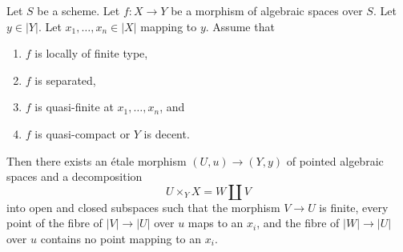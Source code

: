 \begin{lemma}
\label{lemma-etale-splits-off-quasi-finite-part}
Let $S$ be a scheme.
Let $f : X \to Y$ be a morphism of algebraic spaces over $S$.
Let $y \in |Y|$. Let $x_1, \ldots, x_n \in |X|$ mapping to $y$.
Assume that
\begin{enumerate}
\item $f$ is locally of finite type,
\item $f$ is separated,
\item $f$ is quasi-finite at $x_1, \ldots, x_n$, and
\item $f$ is quasi-compact or $Y$ is decent.
\end{enumerate}
Then there exists an \'etale morphism $(U, u) \to (Y, y)$
of pointed algebraic spaces and a decomposition
$$
U \times_Y X = W \amalg V
$$
into open and closed subspaces such that the morphism $V \to U$ is finite,
every point of the fibre of $|V| \to |U|$ over $u$ maps to an $x_i$,
and the fibre of $|W| \to |U|$ over $u$ contains no point mapping to an
$x_i$.
\end{lemma}

